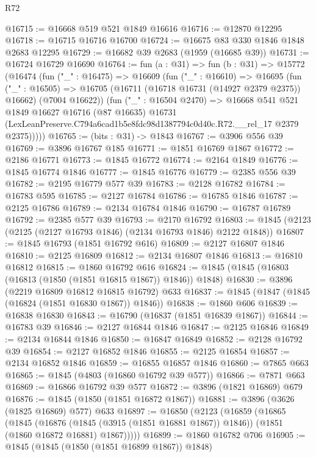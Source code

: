 \begin{lexlean}{R72}
\begin{coremodule}
@16715 := @16668 @519 @521 @1849 @16616
@16716 := @12870 @12295
@16718 := @16715 @16716 @16700
@16724 := @16675 @83 @330 @1846 @1848 @2683 @12295
@16729 := @16682 @39 @2683 (@1959 (@16685 @39))
@16731 := @16724 @16729 @16690
@16764 := fun (a : @31) =>
  fun (b : @31) =>
  @15772
    (@16474
      (fun ("_" : @16475) =>
      @16609
        (fun ("_" : @16610) =>
        @16695
          (fun ("_" : @16505) =>
          @16705 (@16711 (@16718 @16731 (@14927 @2379 @2375)) @16662) (@7004 @16622))
          (fun ("_" : @16504 @2470) =>
          @16668
            @541
            @521
            @1849
            @16627
            @16716
            (@87 @16635)
            @16731
            (LexLeanPreserve.C794a6cad1b5e8fdc98d1387794c0d40c.R72.__rel_17 @2379 @2375)))))
@16765 := (bits : @31) -> @1843
@16767 := @3906 @556 @39
@16769 := @3896 @16767 @185
@16771 := @1851 @16769 @1867
@16772 := @2186 @16771
@16773 := @1845 @16772
@16774 := @2164 @1849
@16776 := @1845 @16774 @1846
@16777 := @1845 @16776
@16779 := @2385 @556 @39
@16782 := @2195 @16779 @577 @39
@16783 := @2128 @16782
@16784 := @16783 @595
@16785 := @2127 @16784
@16786 := @16785 @1846
@16787 := @2125 @16786
@16789 := @2134 @16784 @1846
@16790 := @16787 @16789
@16792 := @2385 @577 @39
@16793 := @2170 @16792
@16803 := @1845 (@2123 (@2125 (@2127 @16793 @1846) (@2134 @16793 @1846) @2122 @1848))
@16807 := @1845 @16793 (@1851 @16792 @616)
@16809 := @2127 @16807 @1846
@16810 := @2125 @16809
@16812 := @2134 @16807 @1846
@16813 := @16810 @16812
@16815 := @1860 @16792 @616
@16824 := @1845 (@1845 (@16803 (@16813 (@1850 (@1851 @16815 @1867)) @1846)) @1848)
@16830 := @3896 (@2219 @16809 @16812 @16815 @16792) @633
@16837 := @1845 (@1847 (@1845 (@16824 (@1851 @16830 @1867)) @1846))
@16838 := @1860 @606
@16839 := @16838 @16830
@16843 := @16790 (@16837 (@1851 @16839 @1867))
@16844 := @16783 @39
@16846 := @2127 @16844 @1846
@16847 := @2125 @16846
@16849 := @2134 @16844 @1846
@16850 := @16847 @16849
@16852 := @2128 @16792 @39
@16854 := @2127 @16852 @1846
@16855 := @2125 @16854
@16857 := @2134 @16852 @1846
@16859 := @16855 @16857 @1846
@16860 := @7865 @663
@16865 := @1845 (@4803 (@16860 @16792 @39 @577))
@16866 := @7871 @663
@16869 := @16866 @16792 @39 @577
@16872 := @3896 (@1821 @16869) @679
@16876 := @1845 (@1850 (@1851 @16872 @1867))
@16881 := @3896 (@3626 (@1825 @16869) @577) @633
@16897 := @16850
    (@2123
      (@16859
        (@16865
          (@1845
            (@16876 (@1845 (@3915 (@1851 @16881 @1867)) @1846))
            (@1851 (@1860 @16872 @16881) @1867)))))
@16899 := @1860 @16782 @706
@16905 := @1845 (@1845 (@1850 (@1851 @16899 @1867)) @1848)

\end{coremodule}
\end{lexlean}
